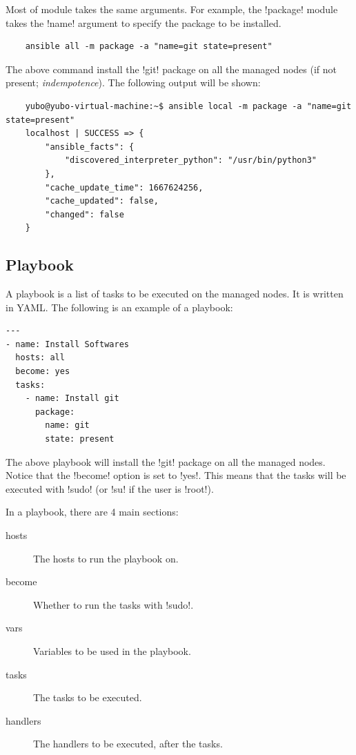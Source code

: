 \documentclass{article}
\begin{document}
Most of module takes the same arguments. For example, the \mono!package! module
takes the \mono!name! argument to specify the package to be installed.

\begin{verbatim}
    ansible all -m package -a "name=git state=present"
\end{verbatim}

The above command install the \mono!git! package on all the managed nodes
(if not present; \emph{indempotence}). The following output will be shown:

\begin{verbatim}
    yubo@yubo-virtual-machine:~$ ansible local -m package -a "name=git state=present"
    localhost | SUCCESS => {
        "ansible_facts": {
            "discovered_interpreter_python": "/usr/bin/python3"
        },
        "cache_update_time": 1667624256,
        "cache_updated": false,
        "changed": false
    }
\end{verbatim}

\subsection{Playbook}

A playbook is a list of tasks to be executed on the managed nodes. It is
written in YAML. The following is an example of a playbook:

\begin{verbatim}
---
- name: Install Softwares
  hosts: all
  become: yes
  tasks:
    - name: Install git
      package:
        name: git
        state: present
\end{verbatim}

The above playbook will install the \mono!git! package on all the managed nodes.
Notice that the \mono!become! option is set to \mono!yes!. This means that the
tasks will be executed with \mono!sudo! (or \mono!su! if the user is \mono!root!).

In a playbook, there are 4 main sections:

\begin{description}
    \item[hosts] The hosts to run the playbook on.
    \item[become] Whether to run the tasks with \mono!sudo!.
    \item[vars] Variables to be used in the playbook.
    \item[tasks] The tasks to be executed.
    \item[handlers] The handlers to be executed, after the tasks.
\end{description}
\end{document}

